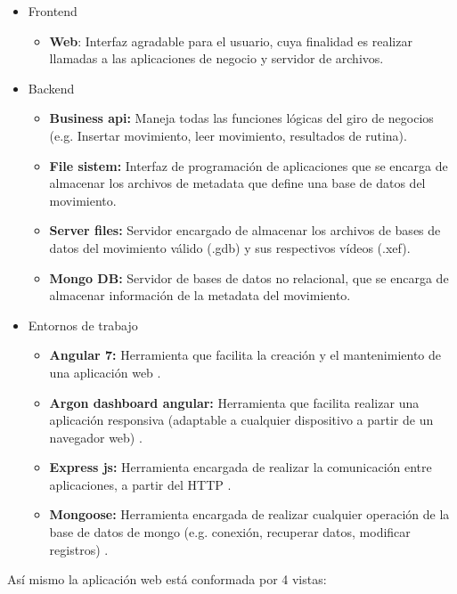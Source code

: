 \begin{itemize}
\item Frontend
	\begin{itemize}
	\item \textbf{Web}: Interfaz agradable para el usuario, cuya finalidad es realizar llamadas a las aplicaciones de negocio y servidor de archivos.
	\end{itemize}
\item Backend
	\begin{itemize}
	\item \textbf{Business api:} Maneja todas las  funciones l\'ogicas del giro de negocios (e.g. Insertar movimiento, leer movimiento, resultados de rutina).
	\item \textbf{File sistem:} Interfaz de programaci\'on de aplicaciones que se encarga de almacenar los archivos de metadata que define una base de datos del movimiento.
		\item \textbf{Server files:} Servidor encargado de almacenar los archivos de bases de datos del movimiento v\'alido (.gdb) y sus respectivos v\'ideos (.xef).
		\item \textbf{Mongo DB:} Servidor de bases de datos no relacional, que se encarga de almacenar informaci\'on de la metadata del movimiento.
	\end{itemize}
\item Entornos de trabajo
\begin{itemize}
\item \textbf{Angular 7:} Herramienta que facilita la creaci\'on y el mantenimiento de una aplicaci\'on web \cite{angular2019}.
\item \textbf{Argon dashboard angular:} Herramienta  que facilita realizar una aplicaci\'on responsiva (adaptable a cualquier dispositivo a partir de un navegador web) \cite{argonDash}.
\item \textbf{Express js:} Herramienta encargada de realizar la comunicaci\'on entre aplicaciones, a partir del \acrlong{HTTP} \cite{fileSistem2019}.
\item \textbf{Mongoose:} Herramienta encargada de realizar cualquier operaci\'on de la base de datos de mongo (e.g. conexi\'on, recuperar datos, modificar registros) \cite{mongoose2019}.
\end{itemize}
\end{itemize}
As\'i mismo la aplicaci\'on web est\'a conformada por 4 vistas:
